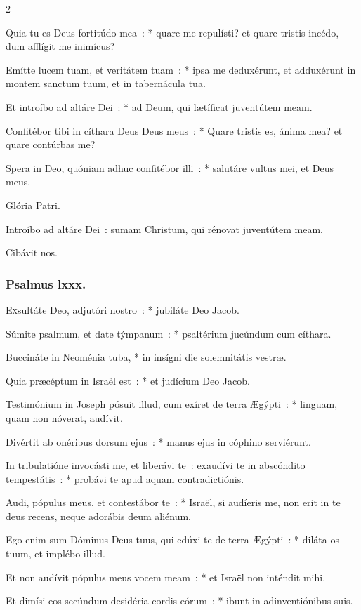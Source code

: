 \documentclass[9pt,twoside]{extarticle}
\begin{document}
\begin{multicols}{2}
{{Quia tu es Deus fortitúdo mea~: * quare me repulísti? et quare tristis incédo, dum afflígit me inimícus?

Emítte lucem tuam, et veritátem tuam~: * ipsa me deduxérunt, et adduxérunt in montem sanctum tuum, et in tabernácula tua.

Et introíbo ad altáre Dei~: * ad Deum, qui lætíficat juventútem meam.

Confitébor tibi in cíthara Deus Deus meus~: * Quare tristis es, ánima mea? et quare contúrbas me?

Spera in Deo, quóniam adhuc confitébor illi~: * salutáre vultus mei, et Deus meus.

Glória Patri.

\begin{tightlist}{}
\item {} Introíbo ad altáre Dei~: sumam Christum, qui rénovat juventútem meam.
\item {} Cibávit nos.
\end{tightlist}

\subsubsection*{\center Psalmus lxxx.}
\lettrine{E}xsultáte Deo, adjutóri nostro~: * jubiláte Deo Jacob.

Súmite psalmum, et date týmpanum~: * psaltérium jucúndum cum cíthara.

Buccináte in Neoménia tuba, * in insígni die solemnitátis vestræ.

Quia præcéptum in Israël est~: * et judícium Deo Jacob.

Testimónium in Joseph pósuit illud, cum exíret de terra Ægýpti~: * linguam, quam non nóverat, audívit.

Divértit ab onéribus dorsum ejus~: * manus ejus in cóphino serviérunt.

In tribulatióne invocásti me, et liberávi te~: exaudívi te in abscóndito tempestátis~: * probávi te apud aquam contradictiónis.

Audi, pópulus meus, et contestábor te~: * Israël, si audíeris me, non erit in te deus recens, neque adorábis deum aliénum.

Ego enim sum Dóminus Deus tuus, qui edúxi te de terra Ægýpti~: * diláta os tuum, et implébo illud.

Et non audívit pópulus meus vocem meam~: * et Israël non inténdit mihi.

Et dimísi eos secúndum desidéria cordis eórum~: * ibunt in adinventiónibus suis.

}}
\end{multicols}
\end{document}
